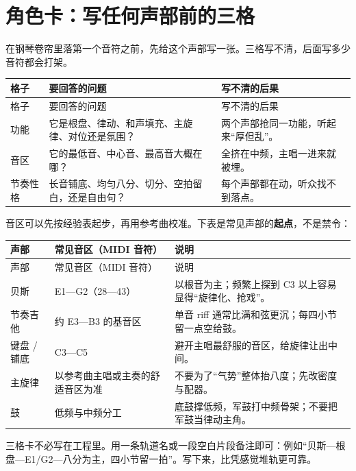 \section{角色卡：写任何声部前的三格}
\label{sec:role-card}

在钢琴卷帘里落第一个音符之前，先给这个声部写一张。三格写不清，后面写多少音符都会打架。

\begin{longtable}{p{}p{}p{}}
\toprule
格子 & 要回答的问题 & 写不清的后果 \\
\midrule
\endfirsthead
\toprule
格子 & 要回答的问题 & 写不清的后果 \\
\midrule
\endhead
功能 & 它是根盘、律动、和声填充、主旋律、对位还是氛围？ & 两个声部抢同一功能，听起来“厚但乱”。 \\
音区 & 它的最低音、中心音、最高音大概在哪？ & 全挤在中频，主唱一进来就被埋。 \\
节奏性格 & 长音铺底、均匀八分、切分、空拍留白，还是自由句？ & 每个声部都在动，听众找不到落点。 \\
\bottomrule
\end{longtable}

音区可以先按经验表起步，再用参考曲校准。下表是常见声部的\textbf{起点}，不是禁令：

\begin{longtable}{p{}p{}p{}}
\toprule
声部 & 常见音区（MIDI 音符） & 说明 \\
\midrule
\endfirsthead
\toprule
声部 & 常见音区（MIDI 音符） & 说明 \\
\midrule
\endhead
贝斯 & E1—G2（28—43） & 以根音为主；频繁上探到 C3 以上容易显得“旋律化、抢戏”。 \\
节奏吉他 & 约 E3—B3 的基音区 & 单音 riff 通常比满和弦更沉；每四小节留一点空给鼓。 \\
键盘 / 铺底 & C3—C5 & 避开主唱最舒服的音区，给旋律让出中间。 \\
主旋律 & 以参考曲主唱或主奏的舒适音区为准 & 不要为了“气势”整体抬八度；先改密度与配器。 \\
鼓 & 低频与中频分工 & 底鼓撑低频，军鼓打中频骨架；不要把军鼓当律动主角。 \\
\bottomrule
\end{longtable}

\begin{tipbox}
三格卡不必写在工程里。用一条轨道名或一段空白片段备注即可：例如“贝斯—根盘—E1/G2—八分为主，四小节留一拍”。写下来，比凭感觉堆轨更可靠。
\end{tipbox}

